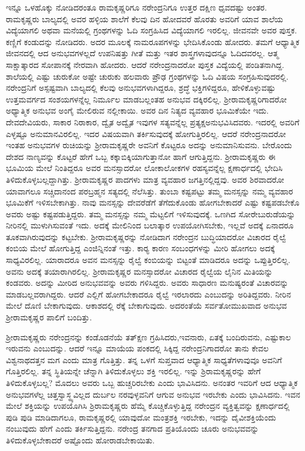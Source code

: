 ಇನ್ನೂ ಒಳಹೊಕ್ಕು ನೋಡಿದರಂತೂ ರಾಮಕೃಷ್ಣರಿಗೂ ನರೇಂದ್ರನಿಗೂ ಉತ್ತರ ದಕ್ಷಿಣ ಧೃವದಷ್ಟು ಅಂತರ. ರಾಮಕೃಷ್ಣರು ಬಾಲ್ಯದಲ್ಲಿ ಅವರ ಹಳ್ಳಿಯ ಶಾಲೆಗೆ ಕೆಲವು ದಿನ ಹೋದವರೆ ಹೊರತು ಅವರಿಗೆ ಯಾವ ಶಾಲೆಯ ವಿದ್ಯೆಯಾಗಲಿ ಅಥವಾ ಮನೆಯಲ್ಲಿ ಗ್ರಂಥಗಳನ್ನು ಓದಿ ಸಂಗ್ರಹಿಸಿದ ವಿದ್ಯೆಯಾಗಲಿ ಇರಲಿಲ್ಲ. ಜೀವನವೇ ಅವರ ಪುಸ್ತಕ. ಕಣ್ಣಿಗೆ ಕಂಡುದನ್ನು ನೋಡಿದರು. ಅದರ ಮೂಲಕ್ಕೆ ನಾಮರೂಪಗಳನ್ನು ಭೇದಿಸಿಕೊಂಡು ಹೋದರು. ತಮಗೆ ಆಧ್ಯಾತ್ಮಿಕ ಜೀವನದಲ್ಲಿ ಆದ ಅನುಭವಗಳಲ್ಲದೆ ಉಪನಿಷತ್ತು ಗೀತೆ ಮತ್ತು ಇತರ ಶಾಸ್ತ್ರಗಳಾವುದನ್ನೂ ಓದಿದವರಲ್ಲ. ಆತ್ಮ ಸಾಕ್ಷಾತ್ಕಾರದ ಸೋಪಾನಕ್ಕೆ ನೇರವಾಗಿ ಹೋದರು. ಆದರೆ ನರೇಂದ್ರನಾದರೋ ಪುಸ್ತಕ ವಿದ್ಯೆಯಲ್ಲಿ ಪಂಡಿತನಾಗಿದ್ದ. ಶಾಲೆಯಲ್ಲಿ ಎಷ್ಟು ಚುರುಕೋ ಅಷ್ಟೇ ಚುರುಕು ಹಲವಾರು ಪ್ರೌಢ ಗ್ರಂಥಗಳನ್ನು ಓದಿ ವಿಷಯ ಸಂಗ್ರಹಿಸುವುದರಲ್ಲಿ. ನರೇಂದ್ರನಿಗೆ ಅಸ್ಪಷ್ಟವಾಗಿ ಬಾಲ್ಯದಲ್ಲಿ ಕೆಲವು ಅನುಭವಗಳಾಗಿದ್ದರೂ, ಶ್ರದ್ಧೆ ಭಕ್ತಿಗಳಿದ್ದರೂ, ಹೇಳಿಕೊಳ್ಳುವಷ್ಟು ಉತ್ತಮವರ್ಗದ ಸಂಶಯಗಳನ್ನೆಲ್ಲ ನಿರ್ಮೂಲ ಮಾಡಬಲ್ಲಂತಹ ಅನುಭವ ದಕ್ಕಿರಲಿಲ್ಲ. ಶ‍್ರೀರಾಮಕೃಷ್ಣರಿಗಾದರೋ ಅಧ್ಯಾತ್ಮಿಕ ಅನುಭವ ಅಂಗೈ ಮೇಲಿರುವ ನಲ್ಲೀಕಾಯಿ. ಅವರ ದಿನ ನಿತ್ಯದ ವ್ಯವಹಾರ ಭೂಮಿಕೆಯೇ ಇದು. ದೇವದೇವಿಯರು, ಸಾಕಾರ ನಿರಾಕಾರ, ದ್ವೈತ ಅದ್ವೈತ ಇವುಗಳ ಸತ್ಯವನ್ನೆಲ್ಲ ಪ್ರತ್ಯಕ್ಷ\break ಅನುಭವಿಸಿದವರು. ಇದರಲ್ಲಿ ಅವರಿಗೆ ಎಳ್ಳಷ್ಟೂ ಅನುಮಾನವಿರಲಿಲ್ಲ. ಇದರ ವಿಷಯವಾಗಿ ತರ್ಕಿಸುವುದಕ್ಕೆ ಹೋಗುತ್ತಿರಲಿಲ್ಲ. ಆದರೆ ನರೇಂದ್ರನಾದರೋ ಇಂತಹ ಅನುಭವಗಳ ರುಚಿಯನ್ನು ಶ‍್ರೀರಾಮಕೃಷ್ಣರೇ ಅವನಿಗೆ ಕೊಟ್ಟರೂ ಅದನ್ನು ಅನುಮಾನಿಸುವನು. ಬೇರೊಂದು ದೇಶದ ನಾಣ್ಯವನ್ನು ಕೊಟ್ಟರೆ ಹೇಗೆ ಒಬ್ಬ ಕಕ್ಕಾಬಿಕ್ಕಿಯಾಗುತ್ತಾನೋ ಹಾಗೆ ಆಗುತ್ತಿದ್ದನು. ಶ‍್ರೀರಾಮಕೃಷ್ಣರು ಈ ಭೂಮಿಯ ಮೇಲೆ ನಿಂತಿದ್ದರೂ ಅವರ ಮನಸ್ಸಾದರೋ ಲೋಕಾಲೋಕಗಳ ರಹಸ್ಯವನ್ನೆಲ್ಲ ಕ್ಷಣಾರ್ಧದಲ್ಲಿ ಭೇದಿಸಿ ತಿಳಿದುಕೊಳ್ಳಬಲ್ಲದ್ದಾಗಿತ್ತು. ಶ‍್ರೀರಾಮಕೃಷ್ಣರ ಪಾದಗಳು ಮಾತ್ರ ವ್ಯವಹಾರ ಜಗತ್ತಿನಲ್ಲಿದ್ದವು. ಅವರ ಶಿರವಾದರೋ ಯಾವಾಗಲೂ ಸಚ್ಚಿದಾನಂದ ಪರಬ್ರಹ್ಮನ ಸತ್ಯದಲ್ಲಿ ನೆಲೆಸಿತ್ತು. ತುಂಬಾ ಕಷ್ಟಪಟ್ಟು ತಮ್ಮ ಮನಸ್ಸನ್ನು ನಮ್ಮ ವ್ಯವಹಾರ ಭೂಮಿಕೆಗೆ ಇಳಿಸಬೇಕಾಗಿತ್ತು. ನಾವು ಮನಸ್ಸನ್ನು ದೇವರೆಡೆಗೆ ತೆಗೆದುಕೊಂಡು ಹೋಗಬೇಕಾದರೆ ಎಷ್ಟು ಕಷ್ಟಪಡಬೇಕೊ ಅವರು ಅಷ್ಟು ಕಷ್ಟಪಡುತ್ತಿದ್ದರು. ತಮ್ಮ ಮನಸ್ಸನ್ನು ನಮ್ಮ ಮೆಟ್ಟಲಿಗೆ ಇಳಿಸುವುದಕ್ಕೆ. ಒಣಗಿದ ಸೋರೇಬುರುಡೆಯನ್ನು ನೀರಿನಲ್ಲಿ ಮುಳುಗಿಸುವಂತೆ ಇದು. ಅದಕ್ಕೆ ಮೇಲಿನಿಂದ ಬಲಾತ್ಕಾರ ಉಪಯೋಗಿಸಬೇಕು, ಇಲ್ಲವೆ ಅದಕ್ಕೆ ಏನಾದರೂ ತೂಕವಾಗಿರುವುದನ್ನು ಕಟ್ಟಬೇಕು. ಶ‍್ರೀರಾಮಕೃಷ್ಣರನ್ನು ನೋಡಿದಾಗ ನರೇಂದ್ರನ ಬುದ್ಧಿಯಾದರೋ ವಿಚಾರದ ರೈಲ್ವೆ ಕಂಬಿಯ ಮೇಲೆ ಹೋಗುತ್ತಿದ್ದ ಎಂಜಿನ್ನಿನಂತೆ ಇತ್ತು. ಕಾರ‍್ಯ ಕಾರಣ ಸಂಬಂಧಗಳನ್ನು ಮೀರಿ ಹೋಗಲು ಅದಕ್ಕೆ ಸಾಧ್ಯವಿರಲಿಲ್ಲ. ಯಾರಾದರೂ ಅವನ ಮನಸ್ಸನ್ನು ರೈಲ್ವೆ ಕಂಬಿಯನ್ನು ಬಿಟ್ಟಂತೆ ಮಾಡಿದರೂ ಅದನ್ನು ಒಪ್ಪುತ್ತಿರಲಿಲ್ಲ. ಅವನು ಅದಕ್ಕೆ ತಯಾರಾಗಿರಲಿಲ್ಲ. ಶ‍್ರೀರಾಮಕೃಷ್ಣರ ಮನಸ್ಸಾದರೋ ವಿಚಾರದ ರೈಲ್ವೆಯ ಲೈನಿನ ಮಿತಿಯನ್ನು ಕಂಡವರು. ಅದನ್ನು ಮೀರಿದ ಅನುಭವವನ್ನು ಅವರು ಗಳಿಸಿದ್ದರು. ಅವರು ಸಾಧಾರಣ ಮನುಷ್ಯರಂತೆ ವಿಚಾರವನ್ನು ಮಾಡಬಲ್ಲವರಾಗಿದ್ದರು. ಆದರೆ ಎಲ್ಲಿಗೆ ಹೋಗಬೇಕಾದರೂ ರೈಲ್ವೆ ಇರಲಾರದು ಎಂಬುದನ್ನು ಅರಿತಿದ್ದವರು. ನೀರಿನ ಮೇಲೆ ದೊಣಿ ಬೇಕಾಗುವುದು. ಆಕಾಶದಲ್ಲಿ ರೆಕ್ಕೆ ಬೇಕಾಗುವುದು. ಅದರಂತೆಯೆ ಸರ್ವತೋಮುಖವಾದ ಅನುಭವ ಶ‍್ರೀರಾಮಕೃಷ್ಣರ ಪಾಲಿಗೆ ಬಂದಿತ್ತು.

ಶ‍್ರೀರಾಮಕೃಷ್ಣರು ನರೇಂದ್ರನನ್ನು ಕಂಡೊಡನೆಯೆ ತತ್‍ಕ್ಷಣ ಗ್ರಹಿಸಿದರು,\break ಇವನಾರು, ಏತಕ್ಕೆ ಬಂದಿರುವನು, ಎಷ್ಟುಕಾಲ ಇರುವನು ಎಂಬುದನ್ನು. ಆದರೆ ಇನ್ನೂ ಮಾಯೆಯ ಪಂಕದಲ್ಲಿ ಸಿಕ್ಕಿದ್ದ ನರೇಂದ್ರನಿಗಾದರೋ ತಾನು ಕೇವಲ ವಿಶ್ವನಾಥದತ್ತನ ಮಗ ಎಂದು ಮಾತ್ರ ಗೊತ್ತಿತ್ತು. ತನ್ನ ಒಳಗೆ ಸುಪ್ತವಾದ ಆಧ್ಯಾತ್ಮಿಕ ಸಾಧ್ಯತೆಗಳಾವುವೂ ಅವನಿಗೆ ಗೊತ್ತಿರಲಿಲ್ಲ. ತನ್ನ ಸ್ಥಿತಿಯನ್ನೇ ಚೆನ್ನಾಗಿ ತಿಳಿದುಕೊಳ್ಳಲು ಶಕ್ತಿ ಇರಲಿಲ್ಲ. ಇನ್ನು ಶ್ರಿರಾಮಕೃಷ್ಣರನ್ನು ಹೇಗೆ ತಿಳಿದುಕೊಳ್ಳಬಲ್ಲ? ಮೊದಲು ಅವರು ಒಬ್ಬ ಹುಚ್ಚರಿರಬೇಕು ಎಂದು ಭಾವಿಸಿದನು. ಅನಂತರ ಇವರಿಗೆ ಆದ ಆಧ್ಯಾತ್ಮಿಕ ಅನುಭವಗಳೆಲ್ಲ ಚಿತ್ತಸ್ವಾಸ್ಥ್ಯವಿಲ್ಲದ ದುರ್ಬಲ ನರವುಳ್ಳವನಿಗೆ ಆಗುವ ಅನುಭವ ಇರಬೇಕು ಎಂದು ಭಾವಿಸಿದನು. ಇವನ ಮೇಲೆ ಶಕ್ತಿಯನ್ನು ಉಪಯೊಗಿಸಿ ಶ್ರಿರಾಮಕೃಷ್ಣರು ಹೆಮ್ಮೆ ಕೊಚ್ಚಿಕೊಳ್ಳುತ್ತಿದ್ದ ನರೇಂದ್ರನ ವ್ಯಕ್ತಿತ್ವವನ್ನು ಕ್ಷಣಾರ್ಧದಲ್ಲಿ ಪುಡಿ ಪುಡಿ ಮಾಡಿದಾಗಲೂ, ರಾಮಕೃಷ್ಣರಲ್ಲಿ ಯಾವುದೋ ಮಂತ್ರಶಕ್ತಿ ಇರಬೇಕು, ಇದನ್ನು ದೈವೀಶಕ್ತಿಯೆಂದು ನಂಬುವುದು ಹೇಗೆ ಎಂದು ತರ್ಕಿಸುತ್ತಿದ್ದನು. ನರೇಂದ್ರ ತನಗಾದ ಪ್ರತಿಯೊಂದು ಚೂರು ಅನುಭವವನ್ನು ತಿಳಿದುಕೊಳ್ಳಬೇಕಾದರೆ ಅಷ್ಟೊಂದು ಹೋರಾಡಬೇಕಾಯಿತು.

